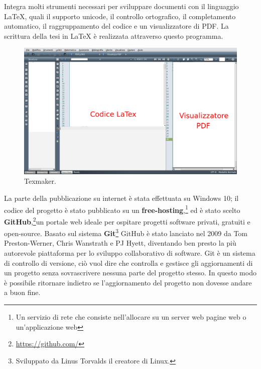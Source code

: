 \documentclass[a4paper,11pt]{article}
\begin{document}
\begin{enumerate}
Integra molti strumenti necessari per sviluppare documenti con il linguaggio LaTeX, quali il supporto unicode, il controllo ortografico, il completamento automatico, il raggruppamento del codice e un visualizzatore di PDF. La scrittura della tesi in LaTeX è realizzata attraverso questo programma.
\begin{figure}[htpb]
	\centering
	\includegraphics[scale=0.30]{texmakex.png}
	\caption{Texmaker.}
	\label{fig:11}
\end{figure}
\end{enumerate}
La parte della pubblicazione su internet è stata effettuata su Windows 10; il codice del progetto è stato pubblicato su un \textbf{free-hosting},\footnote{Un servizio di rete che consiste nell'allocare su un server web pagine web o un'applicazione web} ed è stato scelto \textbf{GitHub},\footnote{\url{https://github.com/}}un portale web ideale per ospitare progetti software privati, gratuiti e open-source. 
Basato sul sistema \textbf{Git}\footnote{Sviluppato da Linus Torvalds il creatore di Linux.} GitHub è stato lanciato nel 2009 da Tom Preston-Werner, Chris Wanstrath e PJ Hyett, diventando ben presto la più autorevole piattaforma per lo sviluppo collaborativo di software.\newline 
Git è un sistema di controllo di versione, ciò vuol dire che controlla e gestisce gli aggiornamenti di un progetto senza sovrascrivere nessuna parte del progetto stesso. In questo modo è possibile ritornare indietro se l'aggiornamento del progetto non dovesse andare a buon fine.
\end{document}
